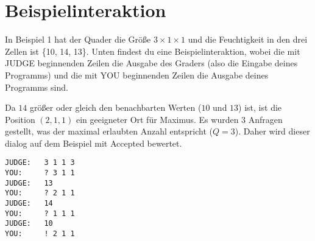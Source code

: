 \section*{Beispielinteraktion}
In Beispiel 1 hat der Quader die Größe $3\times 1\times 1$ und die Feuchtigkeit in den drei Zellen ist \{10, 14, 13\}. Unten findest du eine Beispielinteraktion, wobei die mit JUDGE beginnenden Zeilen die Ausgabe des Graders (also die Eingabe deines Programms) und die mit YOU beginnenden Zeilen die Ausgabe deines Programms sind.

Da $14$ größer oder gleich den benachbarten Werten ($10$ und $13$) ist, ist die Position $(2,1,1)$ ein geeigneter Ort für Maximus. Es wurden 3 Anfragen gestellt, was der maximal erlaubten Anzahl entspricht ($Q=3$).
Daher wird dieser dialog auf dem Beispiel mit Accepted bewertet.

\begin{verbatim}
JUDGE:   3 1 1 3
YOU:     ? 3 1 1
JUDGE:   13
YOU:     ? 2 1 1
JUDGE:   14
YOU:     ? 1 1 1
JUDGE:   10
YOU:     ! 2 1 1
\end{verbatim}

